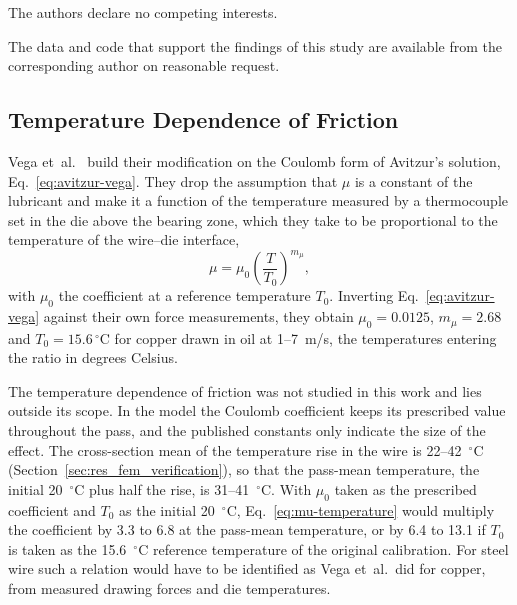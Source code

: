 \documentclass[pdflatex,sn-basic,Numbered]{sn-jnl}
\begin{document}
 The authors declare no competing interests.

 The data and code that support the findings of this study are available from the corresponding author on reasonable request.

\begin{appendices}
%

\section{Temperature Dependence of Friction}\label{app:vega}

Vega et~al.\ \citep{vega2009temperature,vega2009investigation,haddi2011analysis} build their
modification on the Coulomb form of Avitzur's solution, Eq.~\eqref{eq:avitzur-vega}. They drop the
assumption that $\mu$ is a constant of the
lubricant and make it a function of the temperature measured by a thermocouple set in the die above
the bearing zone, which they take to be proportional to the temperature of the wire--die interface,
\begin{equation}
\mu = \mu_0\left(\frac{T}{T_0}\right)^{m_\mu},
\label{eq:mu-temperature}
\end{equation}
with $\mu_0$ the coefficient at a reference temperature $T_0$.
Inverting Eq.~\eqref{eq:avitzur-vega} against their own force measurements, they obtain
$\mu_0 = 0.0125$,
$m_\mu = 2.68$ and $T_0 = 15.6\,^\circ$C for copper drawn in oil at 1--7~m/s, the temperatures
entering the ratio in degrees Celsius.

The temperature dependence of friction was not studied in this work and lies outside its scope.
In the model the Coulomb coefficient keeps its prescribed value throughout the pass, and the
published constants only indicate the size of the effect. The cross-section mean of the
temperature rise in the wire is 22--42~$^\circ$C (Section~\ref{sec:res_fem_verification}), so that
the pass-mean temperature, the initial 20~$^\circ$C plus half the rise, is 31--41~$^\circ$C. With
$\mu_0$ taken as the prescribed coefficient and $T_0$ as the initial 20~$^\circ$C,
Eq.~\eqref{eq:mu-temperature} would multiply the coefficient by 3.3 to 6.8 at the pass-mean
temperature, or by 6.4 to 13.1 if $T_0$ is taken as the 15.6~$^\circ$C reference temperature of
the original calibration. For steel wire such a relation would have to be identified as Vega
et~al.\ did for copper, from measured drawing forces and die temperatures.


\end{appendices}
\end{document}
